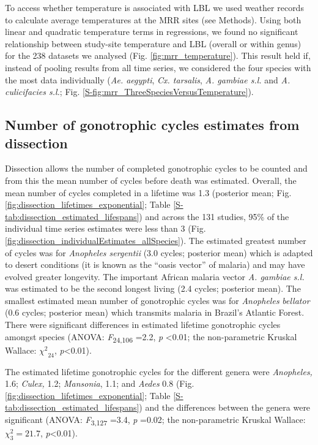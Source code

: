 \documentclass[]{article}
\begin{document}
To access whether temperature is associated with LBL we used weather
records to calculate average temperatures at the MRR sites (see
Methods). Using both linear and quadratic temperature terms in
regressions, we found no significant relationship between study-site
temperature and LBL (overall or within genus) for the 238 datasets we
analysed (Fig. \ref{fig:mrr_temperature}). This result held if, instead of pooling results from
all time series, we considered the four species with the most data
individually (\emph{Ae. aegypti}, \emph{Cx. tarsalis}, \emph{A. gambiae s.l.} and
\emph{A. culicifacies s.l.}; Fig. \ref{S-fig:mrr_ThreeSpeciesVersusTemperature}).

\subsection{Number of gonotrophic cycles estimates from
dissection}\label{number-of-gonotrophic-cycles-estimates-from-dissection}

Dissection allows the number of completed gonotrophic cycles to be
counted and from this the mean number of cycles before death was
estimated. Overall, the mean number of cycles completed in a lifetime
was 1.3 (posterior mean; Fig. \ref{fig:dissection_lifetimes_exponential}; Table \ref{S-tab:dissection_estimated_lifespans}) and across the 131 studies, 95\% of
the individual time series estimates were less than 3 (Fig. \ref{fig:dissection_individualEstimates_allSpecies}). The
estimated greatest number of cycles was for \emph{Anopheles sergentii}
(3.0 cycles; posterior mean) which is adapted to desert conditions (it
is known as the ``oasis vector'' of malaria) and may have evolved
greater longevity. The important African malaria vector \emph{A.
gambiae s.l.} was estimated to be the second longest living (2.4 cycles;
posterior mean). The smallest estimated mean number of gonotrophic
cycles was for \emph{Anopheles} \emph{bellator} (0.6 cycles; posterior
mean) which transmits malaria in Brazil's Atlantic Forest. There were
significant differences in estimated lifetime gonotrophic cycles amongst
species (ANOVA: \emph{F}\textsubscript{24,106} =2.2, \emph{p}
\textless{}0.01; the non-parametric Kruskal Wallace:
\({\chi^{2}}_{24}\), \emph{p}\textless{}0.01).

The estimated lifetime gonotrophic cycles for the different genera were
\emph{Anopheles,} 1.6; \emph{Culex,} 1.2; \emph{Mansonia}, 1.1; and
\emph{Aedes} 0.8 (Fig. \ref{fig:dissection_lifetimes_exponential}; Table \ref{S-tab:dissection_estimated_lifespans}) and the differences between the genera were
significant (ANOVA: \emph{F}\textsubscript{3,127} =3.4, \emph{p} =0.02;
the non-parametric Kruskal Wallace: \(\chi_{3}^{2} = 21.7\),
\emph{p}\textless{}0.01).
\end{document}
